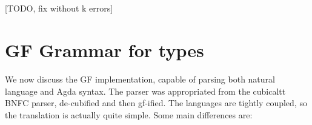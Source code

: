 \documentclass[11pt, a4paper]{article}
\begin{document}
\begin{code}
\AgdaSpace{}%
\AgdaSpace{}%
\AgdaSpace{}%
\AgdaSpace{}%
\<%
\\
%
\\[\AgdaEmptyExtraSkip]%
%
\>[2]\<%
\\
%
\>[2]\AgdaSpace{}%
\AgdaSymbol{:}\AgdaSpace{}%
\AgdaSymbol{\{}\AgdaSpace{}%
\AgdaSymbol{:}\AgdaSpace{}%
\AgdaSymbol{\}}\AgdaSpace{}%
\AgdaSpace{}%
\AgdaSymbol{(}\AgdaSpace{}%
\AgdaSymbol{:}\AgdaSpace{}%
\AgdaSymbol{)}\AgdaSpace{}%
\AgdaSpace{}%
\AgdaSymbol{(}\AgdaSpace{}%
\AgdaSpace{}%
\AgdaSymbol{:}\AgdaSpace{}%
\AgdaSpace{}%
\AgdaSymbol{\{}\AgdaSymbol{\}}\AgdaSpace{}%
\AgdaSymbol{)}\AgdaSpace{}%
\AgdaSpace{}%
\AgdaSymbol{(}\AgdaSpace{}%
\AgdaSpace{}%
\AgdaSymbol{)}\AgdaSpace{}%
\AgdaSpace{}%
\AgdaSymbol{(}\AgdaSpace{}%
\AgdaSpace{}%
\AgdaSymbol{)}\<%
\\
%
\>[2]\AgdaSpace{}%
\AgdaSpace{}%
\AgdaSpace{}%
\AgdaSpace{}%
\AgdaSymbol{=}\AgdaSpace{}%
\AgdaSpace{}%
\AgdaSpace{}%
\AgdaSpace{}%
\AgdaSpace{}%
\AgdaSpace{}%
\AgdaSpace{}%
\AgdaSpace{}%
\AgdaSpace{}%
\<%
\\
%
\\[\AgdaEmptyExtraSkip]%
%
\\[\AgdaEmptyExtraSkip]%
%
\>[2]\<%
\\
%
\>[2]\<%
\\
\>[0]\<%
\end{code}

[TODO, fix without k errors]

\section{GF Grammar for types}

We now discuss the GF implementation, capable of parsing both natural language
and Agda syntax. The parser was appropriated from the cubicaltt BNFC parser,
de-cubified and then gf-ified. The languages are tightly coupled, so the
translation is actually quite simple. Some main differences are:
\end{document}
